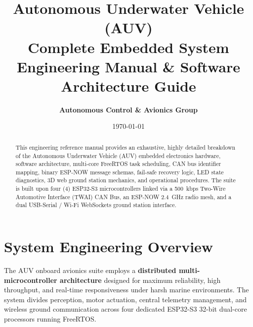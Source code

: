 \documentclass[11pt,a4paper]{article}
\title{\textbf{\Huge Autonomous Underwater Vehicle (AUV)}\\[0.3em]
\Large Complete Embedded System Engineering Manual \& Software Architecture Guide}
\author{\textbf{Autonomous Control \& Avionics Group}}
\date{\today}
\begin{document}
\maketitle

\begin{abstract}
This engineering reference manual provides an exhaustive, highly detailed breakdown of the Autonomous Underwater Vehicle (AUV) embedded electronics hardware, software architecture, multi-core FreeRTOS task scheduling, CAN bus identifier mapping, binary ESP-NOW message schemas, fail-safe recovery logic, LED state diagnostics, 3D web ground station mechanics, and operational procedures. The suite is built upon four (4) ESP32-S3 microcontrollers linked via a 500~kbps Two-Wire Automotive Interface (TWAI) CAN Bus, an ESP-NOW 2.4~GHz radio mesh, and a dual USB-Serial / Wi-Fi WebSockets ground station interface.
\end{abstract}

\tableofcontents
\newpage

\section{System Engineering Overview}

The AUV onboard avionics suite employs a \textbf{distributed multi-microcontroller architecture} designed for maximum reliability, high throughput, and real-time responsiveness under harsh marine environments. The system divides perception, motor actuation, central telemetry management, and wireless ground communication across four dedicated ESP32-S3 32-bit dual-core processors running FreeRTOS.
\end{document}
